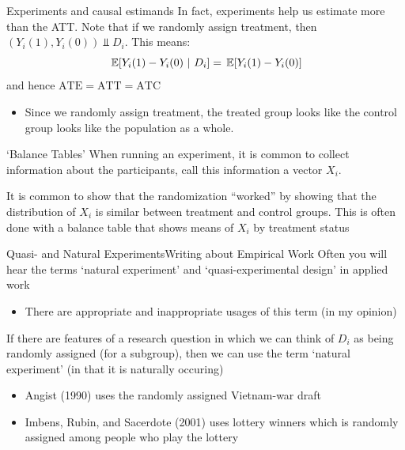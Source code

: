 \documentclass[aspectratio=169,t,11pt,table]{beamer}
\begin{document}
\begin{frame}{Experiments and causal estimands}
  In fact, experiments help us estimate more than the ATT. Note that if we randomly assign treatment, then $(Y_i(1), Y_i(0)) \Perp D_i$. This means: 
  $$
    \expec{Y_i(1) - Y_i(0)}{D_i} = \expec{Y_i(1) - Y_i(0)}
  $$
  and hence $\text{ATE} = \text{ATT} = \text{ATC}$

  \begin{itemize}
    \item Since we randomly assign treatment, the treated group looks like the control group looks like the population as a whole.
  \end{itemize}
\end{frame}

\begin{frame}{`Balance Tables'}
  When running an experiment, it is common to collect information about the participants, call this information a vector $X_i$.

  \bigskip
  It is common to show that the randomization ``worked'' by showing that the distribution of $X_i$ is similar between treatment and control groups. 
  This is often done with a \alert{balance table} that shows means of $X_i$ by treatment status
\end{frame}



\begin{frame}{Quasi- and Natural Experiments}{Writing about Empirical Work}
  Often you will hear the terms `natural experiment' and `quasi-experimental design' in applied work
  \begin{itemize}
    \item There are appropriate and inappropriate usages of this term (in my opinion)
  \end{itemize}

  \bigskip
  If there are features of a research question in which we can think of $D_i$ as being randomly assigned (for a subgroup), then we can use the term `natural experiment' (in that it is naturally occuring)
  \begin{itemize}
    \item Angist (1990) uses the randomly assigned Vietnam-war draft
    \item Imbens, Rubin, and Sacerdote (2001) uses lottery winners which is randomly assigned among people who play the lottery
  \end{itemize}
\end{frame}
\end{document}
